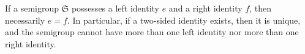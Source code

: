 If a semigroup $\mathfrak{S}$ possesses a left identity $e$ and a right identity $f$, then necessarily $e = f$. In particular, if a two-sided identity exists, then it is unique, and the semigroup cannot have more than one left identity nor more than one right identity.

